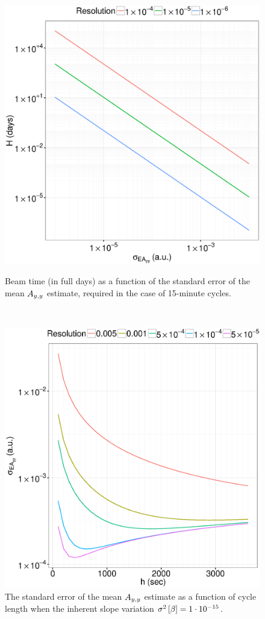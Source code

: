 \documentclass{article}
\begin{document}
\begin{figure}[h]
	\centering
	\begin{minipage}{.5\textwidth}
		\centering
		\includegraphics[scale=.5]{BeamTime_15minCycles.eps}
		\caption{Beam time (in full days) as a function of the standard error of the mean $\Ayy$ estimate, required in the case of 15-minute cycles.\label{fig:BeamTime}}
	\end{minipage}~~~~ %
	\begin{minipage}{.5\textwidth}
		\centering
		\includegraphics[scale=.5]{SEAyy_varB_15min.eps}
		\caption{The standard error of the mean $\Ayy$ estimate as a function of cycle length when the inherent slope variation $\v{\slp} = 1\cdot10^{-15}$.\label{fig:SEAyy_varb}}
	\end{minipage}


\end{figure}
\end{document}
